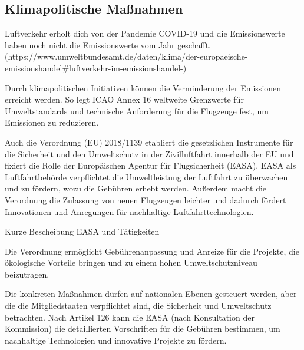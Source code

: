 \subsection{Klimapolitische Maßnahmen}
\label{s:Klimapolitische Maßnahmen}


Luftverkehr erholt dich von der Pandemie COVID-19 und die Emissionswerte haben noch nicht die Emissionswerte vom Jahr geschafft.
 (https://www.umweltbundesamt.de/daten/klima/der-europaeische-emissionshandel#luftverkehr-im-emissionshandel-)

Durch klimapolitischen Initiativen können die Verminderung der Emissionen erreicht werden. 
So legt ICAO Annex 16 weltweite Grenzwerte für Umweltstandards und technische Anforderung für die Flugzeuge fest, um Emissionen zu reduzieren.

Auch die Verordnung (EU) 2018/1139 etabliert die gesetzlichen Instrumente für die Sicherheit und den Umweltschutz in der Zivilluftfahrt innerhalb der EU 
und fixiert die Rolle der Europäischen Agentur für Flugsicherheit (EASA). EASA als Luftfahrtbehörde verpflichtet die 
Umweltleistung der Luftfahrt zu überwachen und zu fördern, wozu die Gebühren erhebt werden. Außerdem macht die Verordnung die Zulassung von
neuen Flugzeugen leichter und dadurch fördert Innovationen und Anregungen für nachhaltige Luftfahrttechnologien.

Kurze Bescheibung EASA und Tätigkeiten

Die Verordnung ermöglicht Gebührenanpassung und Anreize für die Projekte, die ökologische Vorteile bringen und 
zu einem hohen Umweltschutzniveau beizutragen.

Die konkreten Maßnahmen dürfen auf nationalen Ebenen gesteuert werden, aber die die Mitgliedstaaten verpflichtet sind, 
die Sicherheit und Umweltschutz betrachten. Nach Artikel 126 kann die EASA (nach Konsultation der Kommission) die detaillierten 
Vorschriften für die Gebühren bestimmen, um nachhaltige Technologien und innovative Projekte zu fördern.



